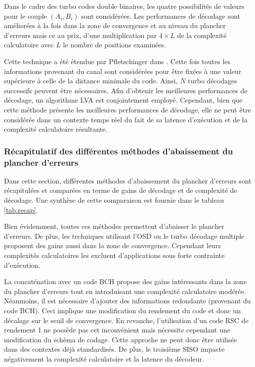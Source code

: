 Dans le cadre des turbo codes double binaires, les quatre possibilités de valeurs pour le couple $(A_i,B_i)$ sont 
considérées. Les performances de décodage sont améliorées à la fois dans la zone de convergence et au niveau du plancher 
d'erreurs mais ce au prix, 
d'une multiplication par $4\times L$ de la complexité calculatoire avec $L$ le nombre de positions examinées.

Cette technique a été étendue par Pfletschinger dans \cite{pflet}. Cette fois toutes les informations provenant du canal 
sont considérées pour être fixées à une valeur supérieure à celle de la distance minimale du code. Ainsi, $N$ turbo 
décodages successifs peuvent être nécessaires. Afin d'obtenir les meilleures performances de décodage, un algorithme LVA 
est conjointement employé. Cependant, bien que cette méthode présente les meilleures performances de décodage, elle ne 
peut être considérée dans un contexte temps réel du fait de sa latence d'exécution et de la complexité calculatoire 
résultante.

\subsubsection{Récapitulatif des différentes méthodes d'abaissement du plancher d'erreurs}
Dans cette section, différentes méthodes d'abaissement du plancher d'erreurs sont récapitulées et comparées en terme de 
gains de décodage et de complexité de décodage. Une synthèse de cette comparaison est fournie dans le tableau \ref{tab:recap}.

Bien évidemment, toutes ces méthodes permettent d'abaisser le plancher d'erreurs. De plus, les techniques utilisant l'OSD 
ou le turbo décodage multiple proposent des gains aussi dans la zone de convergence. Cependant leurs complexités calculatoires 
les excluent d'applications sous forte contrainte d'exécution. 

La concaténation avec un code BCH propose des gains intéressants dans la zone du plancher d'erreurs tout en introduisant une
complexité calculatoire modérée. Néanmoins, il est nécessaire d'ajouter des informations redondante (provenant du code BCH). 
Ceci implique une modification du rendement du code et donc un décalage sur le seuil de convergence. 
En revanche, l'utilisation d'un code RSC de rendement 1 ne possède pas cet inconvénient mais nécessite cependant une 
modification du schéma de codage. Cette approche ne peut donc être utilisée dans des contextes déjà standardisés. De plus, le 
troisième SISO impacte négativement la complexité calculatoire et la latence du décodeur.

